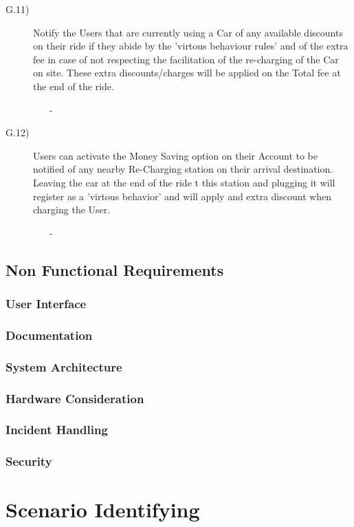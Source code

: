 \documentclass[a4paper]{article}
\begin{document}
\begin{description}
\item [G.11)]Notify the Users that are currently using a Car of any available discounts on their ride if they abide by the 'virtous behaviour rules' and of the extra fee in case of not respecting the facilitation of the re-charging of the Car on site. These extra discounts/charges will be applied on the Total fee at the end of the ride.
\begin{itemize}
	\item[-]
\end{itemize}
\item [G.12)]Users can activate the Money Saving option on their Account to be notified of any nearby Re-Charging station on their arrival destination. Leaving the car at the end of the ride t this station and plugging it will register as a 'virtous behavior' and will apply and extra discount when charging the User.
\begin{itemize}
	\item[-]
\end{itemize}
\end{description}

\subsection{Non Functional Requirements}
\subsubsection{User Interface}
\subsubsection{Documentation}
\subsubsection{System Architecture}
\subsubsection{Hardware Consideration}
\subsubsection{Incident Handling}
\subsubsection{Security}
\section{Scenario Identifying}
\end{document}
